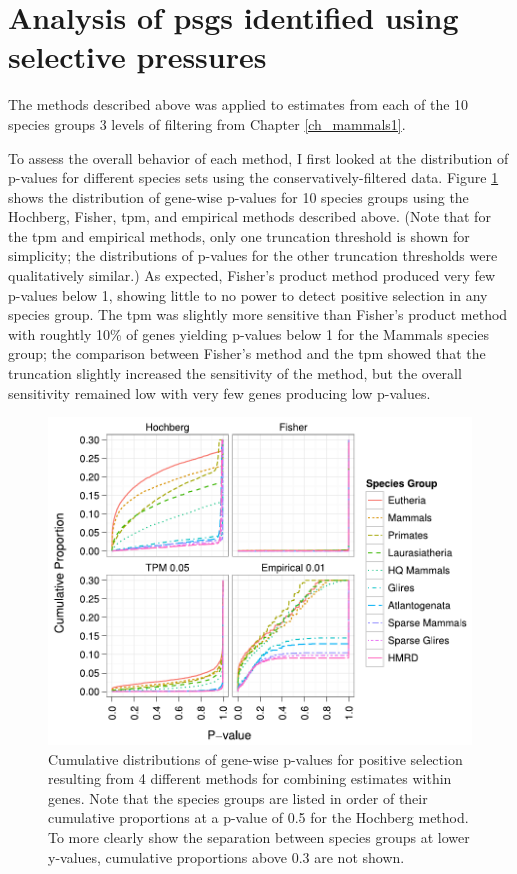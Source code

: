 \section{Analysis of \acp{psg} identified using \sw selective pressures}

The methods described above was applied to \sw estimates from each of
the 10 species groups 3 levels of \sw filtering from Chapter
\ref{ch_mammals1}.

To assess the overall behavior of each method, I first looked at the
distribution of p-values for different species sets using the
conservatively-filtered \sw data. Figure \ref{fig_psg_pvals} shows the
distribution of gene-wise p-values for 10 species groups using the
Hochberg, Fisher, \ac{tpm}, and empirical methods described
above. (Note that for the \ac{tpm} and empirical methods, only one
truncation threshold is shown for simplicity; the distributions of
p-values for the other truncation thresholds were qualitatively
similar.) As expected, Fisher's product method produced very few
p-values below 1, showing little to no power to detect positive
selection in any species group. The \ac{tpm} was slightly more
sensitive than Fisher's product method with roughtly 10\% of genes
yielding p-values below 1 for the Mammals species group; the
comparison between Fisher's method and the \ac{tpm} showed that the
truncation slightly increased the sensitivity of the method, but the
overall sensitivity remained low with very few genes producing low
p-values.

\begin{figure}
\centering
\includegraphics[scale=0.9]{Figs/psg_pvals.pdf}
\caption{Cumulative distributions of gene-wise p-values for positive
  selection resulting from 4 different methods for combining \sw
  estimates within genes. Note that the species groups are listed in
  order of their cumulative proportions at a p-value of 0.5 for the
  Hochberg method. To more clearly show the separation between species
  groups at lower y-values, cumulative proportions above 0.3 are not
  shown.}
\label{fig_psg_pvals}
\end{figure}

